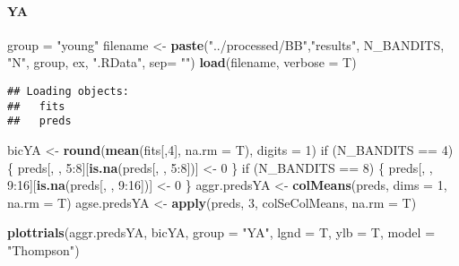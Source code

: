 \documentclass[11pt,,]{article}
\newenvironment{Shaded}{\begin{snugshade}}{\end{snugshade}}
\newcommand{\KeywordTok}[1]{\textcolor[rgb]{0.13,0.29,0.53}{\textbf{{#1}}}}
\newcommand{\DataTypeTok}[1]{\textcolor[rgb]{0.13,0.29,0.53}{{#1}}}
\newcommand{\DecValTok}[1]{\textcolor[rgb]{0.00,0.00,0.81}{{#1}}}
\newcommand{\StringTok}[1]{\textcolor[rgb]{0.31,0.60,0.02}{{#1}}}
\newcommand{\NormalTok}[1]{{#1}}
\let\oldparagraph\paragraph
\renewcommand{\paragraph}[1]{\oldparagraph{#1}\mbox{}}
\begin{document}
\paragraph{YA}\label{ya}

\begin{Shaded}
\begin{Highlighting}[]
\NormalTok{group =}\StringTok{ "young"}
\NormalTok{filename  <-}\StringTok{ }\KeywordTok{paste}\NormalTok{(}\StringTok{"../processed/BB"}\NormalTok{,}\StringTok{"results"}\NormalTok{, N_BANDITS, }\StringTok{"N"}\NormalTok{, }
                   \NormalTok{group, ex, }\StringTok{".RData"}\NormalTok{, }\DataTypeTok{sep=} \StringTok{""}\NormalTok{)}
\KeywordTok{load}\NormalTok{(filename, }\DataTypeTok{verbose =} \NormalTok{T)}
\end{Highlighting}
\end{Shaded}

\begin{verbatim}
## Loading objects:
##   fits
##   preds
\end{verbatim}

\begin{Shaded}
\begin{Highlighting}[]
\NormalTok{bicYA <-}\StringTok{ }\KeywordTok{round}\NormalTok{(}\KeywordTok{mean}\NormalTok{(fits[,}\DecValTok{4}\NormalTok{], }\DataTypeTok{na.rm =} \NormalTok{T), }\DataTypeTok{digits =} \DecValTok{1}\NormalTok{)}
\NormalTok{if (N_BANDITS ==}\StringTok{ }\DecValTok{4}\NormalTok{) \{}
    \NormalTok{preds[, , }\DecValTok{5}\NormalTok{:}\DecValTok{8}\NormalTok{][}\KeywordTok{is.na}\NormalTok{(preds[, , }\DecValTok{5}\NormalTok{:}\DecValTok{8}\NormalTok{])] <-}\StringTok{ }\DecValTok{0}
\NormalTok{\}}
\NormalTok{if (N_BANDITS ==}\StringTok{ }\DecValTok{8}\NormalTok{) \{}
    \NormalTok{preds[, , }\DecValTok{9}\NormalTok{:}\DecValTok{16}\NormalTok{][}\KeywordTok{is.na}\NormalTok{(preds[, , }\DecValTok{9}\NormalTok{:}\DecValTok{16}\NormalTok{])] <-}\StringTok{ }\DecValTok{0}
\NormalTok{\}}
\NormalTok{aggr.predsYA <-}\StringTok{ }\KeywordTok{colMeans}\NormalTok{(preds, }\DataTypeTok{dims =} \DecValTok{1}\NormalTok{, }\DataTypeTok{na.rm =} \NormalTok{T) }
\NormalTok{agse.predsYA <-}\StringTok{ }\KeywordTok{apply}\NormalTok{(preds, }\DecValTok{3}\NormalTok{, colSeColMeans, }\DataTypeTok{na.rm =} \NormalTok{T) }
\end{Highlighting}
\end{Shaded}

\begin{Shaded}
\begin{Highlighting}[]
\KeywordTok{plottrials}\NormalTok{(aggr.predsYA, bicYA, }\DataTypeTok{group =} \StringTok{"YA"}\NormalTok{, }\DataTypeTok{lgnd =} \NormalTok{T, }\DataTypeTok{ylb =} \NormalTok{T, }\DataTypeTok{model =} \StringTok{"Thompson"}\NormalTok{)}
\end{Highlighting}
\end{Shaded}
\end{document}
